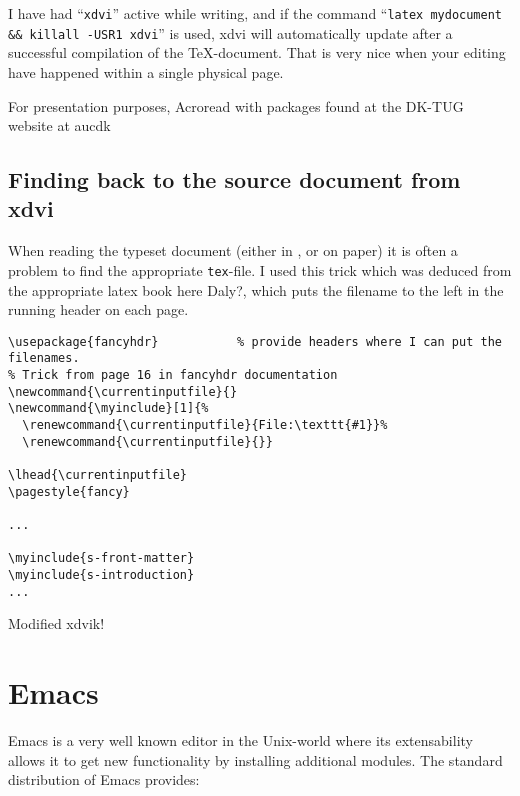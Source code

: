 I have had ``\texttt{xdvi}'' active while writing, and if the command
``\texttt{latex mydocument \&\& killall -USR1 xdvi}'' is used, xdvi
will automatically update after a successful compilation of the
TeX-document.  That is very nice when your editing have happened
within a single physical page.

For presentation purposes, \textsf{Acroread with packages found at the
  DK-TUG website at aucdk}

\subsection{Finding back to the source document from xdvi}

When reading the typeset document (either in ,
 or on paper) it is often a problem to find the
appropriate \texttt{tex}-file.  I used this trick which was deduced
from the \textsf{appropriate latex book here Daly?}, which puts the
filename to the left in the running header on each page.

\begin{verbatim}
\usepackage{fancyhdr}           % provide headers where I can put the filenames.
% Trick from page 16 in fancyhdr documentation
\newcommand{\currentinputfile}{}
\newcommand{\myinclude}[1]{%
  \renewcommand{\currentinputfile}{File:\texttt{#1}}%
  \renewcommand{\currentinputfile}{}}

\lhead{\currentinputfile}
\pagestyle{fancy}

...

\myinclude{s-front-matter}
\myinclude{s-introduction}
...
\end{verbatim}

\textsf{Modified xdvik}!

\section{Emacs} 
\label{sec:report-writing-tools-emacs} 


Emacs is a very well known editor in the Unix-world where its
extensability allows it to get new functionality by installing
additional modules.  The standard distribution of Emacs provides:

